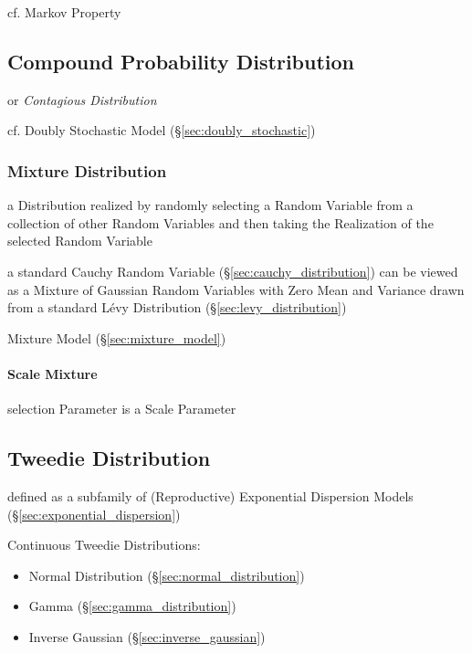 cf. Markov Property



\subsection{Compound Probability Distribution}
\label{sec:compound_probability}

or \emph{Contagious Distribution}

cf. Doubly Stochastic Model (\S\ref{sec:doubly_stochastic})



\subsubsection{Mixture Distribution}\label{sec:mixture_distribution}

a Distribution realized by randomly selecting a Random Variable from a
collection of other Random Variables and then taking the Realization of the
selected Random Variable

a standard Cauchy Random Variable (\S\ref{sec:cauchy_distribution}) can be
viewed as a Mixture of Gaussian Random Variables with Zero Mean and Variance
drawn from a standard L\'evy Distribution (\S\ref{sec:levy_distribution})

Mixture Model (\S\ref{sec:mixture_model})



\paragraph{Scale Mixture}\label{sec:scale_mixture}\hfill

selection Parameter is a Scale Parameter



\subsection{Tweedie Distribution}\label{sec:tweedie_distribution}

defined as a subfamily of (Reproductive) Exponential Dispersion Models
(\S\ref{sec:exponential_dispersion})

Continuous Tweedie Distributions:
\begin{itemize}
  \item Normal Distribution (\S\ref{sec:normal_distribution})
  \item Gamma (\S\ref{sec:gamma_distribution})
  \item Inverse Gaussian (\S\ref{sec:inverse_gaussian})
\end{itemize}

